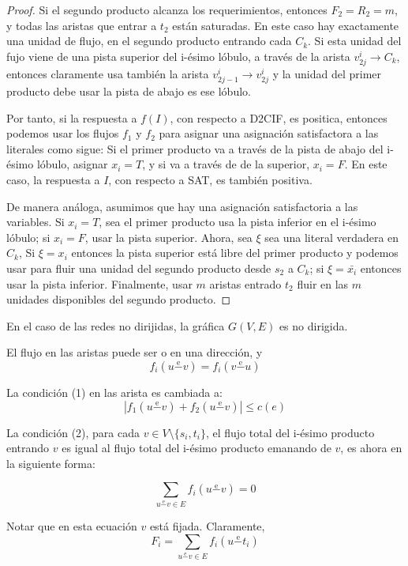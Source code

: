 \documentclass[12pt,letterpaper]{article}
\begin{document}
\begin{theorem}
\begin{proof}
    Si el segundo producto alcanza los requerimientos, entonces $F_2 = R_2 = m$, y todas las aristas
    que entrar a $t_2$ están saturadas. En este caso hay exactamente una unidad de flujo, en el
    segundo producto entrando cada $C_k$. Si esta unidad del fujo viene de una pista superior del
    i-ésimo lóbulo, a través de la arista $v_{2j}^i \to C_k$, entonces claramente usa también la
    arista $v_{2j-1}^i \to v_{2j}^i$ y la unidad del primer producto debe usar la pista de abajo 
    es ese lóbulo.

    Por tanto, si la respuesta a $f(I)$, con respecto a D2CIF, es positica, entonces podemos usar
    los flujos $f_1$ y $f_2$ para asignar una asignación satisfactora a las literales como sigue:
    Si el primer producto va a través de la pista de abajo del i-ésimo lóbulo, asignar $x_i = T$,
    y si va a través de de la superior, $x_i = F$. En este caso, la respuesta a $I$, con respecto 
    a SAT, es también positiva.

    De manera análoga, asumimos que hay una asignación satisfactoria a las variables. Si $x_i = T$,
    sea el primer producto usa la pista inferior en el i-ésimo lóbulo; si $x_i = F$, usar la
    pista superior. Ahora, sea $\xi$ sea una literal verdadera en $C_k$, Si $\xi = x_i$ entonces 
    la pista superior está libre del primer producto y podemos usar para fluir una unidad del segundo
    producto desde $s_2$ a $C_k$; si $\xi = \bar{x_i}$ entonces usar la pista inferior.
    Finalmente, usar $m$ aristas entrado $t_2$ fluir en las $m$ unidades disponibles del
    segundo producto.
\end{proof}
\end{theorem}

En el caso de las redes no dirijidas, la gráfica $G(V,E)$ es no dirigida.

El flujo en las aristas puede ser o en una dirección, y
$$  f_i(u \overset{\mathrm{e}}{-} v) = f_i(v \overset{\mathrm{e}}{-} u) $$

La condición (1) en las arista es cambiada a:
$$  | f_1(u \overset{\mathrm{e}}{-} v) + f_2(u \overset{\mathrm{e}}{-} v)| \leq c(e)$$

La condición (2), para cada $v \in V \setminus \{ s_i,t_i \}$, el flujo total del i-ésimo producto
entrando $v$ es igual al flujo total del i-ésimo producto emanando de $v$, es ahora en la
siguiente forma:

$$  \sum_{u \overset{\mathrm{e}}{-} v \in E} f_i(u \overset{\mathrm{e}}{-} v) = 0   $$

Notar que en esta ecuación $v$ está fijada. Claramente,
$$  F_i = \sum_{u \overset{\mathrm{e}}{-} v \in E} f_i(u \overset{\mathrm{e}}{-} t_i)   $$
\end{document}
